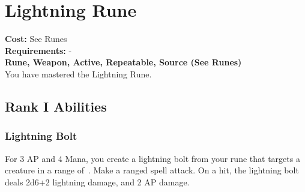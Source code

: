 \section{Lightning Rune}\label{rune:lightning}
\textbf{Cost:} See Runes\\
\textbf{Requirements:} -\\
\textbf{Rune, Weapon, Active, Repeatable, Source (See Runes)}\\
You have mastered the Lightning Rune.

\subsection{Rank I Abilities}

\subsubsection{Lightning Bolt}
For 3 AP and 4 Mana, you create a lightning bolt from your rune that targets a creature in a range of~.
Make a ranged spell attack.
On a hit, the lightning bolt deals 2d6+2 lightning damage, and 2 AP damage.